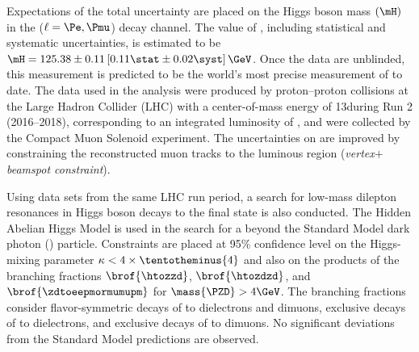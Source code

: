 % 
Expectations of the total uncertainty are placed on the Higgs boson mass $(\mH)$ in the \hzzfourl ($\ell = \Pe, \Pmu$) decay channel.
The value of \mH, including statistical and systematic uncertainties, is estimated to be $\mH = 125.38 \pm 0.11\left[0.11\stat \pm 0.02\syst \right]\GeV$.
Once the data are unblinded, this measurement is predicted to be the world's most precise measurement of \mH to date.
The data used in the analysis were produced by proton--proton collisions at the Large Hadron Collider (LHC) with a center-of-mass energy of 13\TeV during Run 2 (2016--2018), corresponding to an integrated luminosity of \lumiruntwo, and were collected by the Compact Muon Solenoid experiment.
The uncertainties on \mH are improved by constraining the reconstructed muon tracks to the luminous region (\emph{vertex$+$beamspot constraint}).

Using data sets from the same LHC run period, a search for low-mass dilepton resonances in Higgs boson decays to the \fourl final state is also conducted.
The Hidden Abelian Higgs Model is used in the search for a beyond the Standard Model dark photon (\PZD) particle.
Constraints are placed at 95\% confidence level on the Higgs-mixing parameter $\kappa < 4 \times \tentotheminus{4}$ and also on the products of the branching fractions $\brof{\htozzd}$, $\brof{\htozdzd}$, and $\brof{\zdtoeepmormumupm}$ for $\mass{\PZD} > 4\GeV$.
The branching fractions consider flavor-symmetric decays of \PZD to dielectrons and dimuons, exclusive decays of \PZD to dielectrons, and exclusive decays of \PZD to dimuons.
No significant deviations from the Standard Model predictions are observed.

